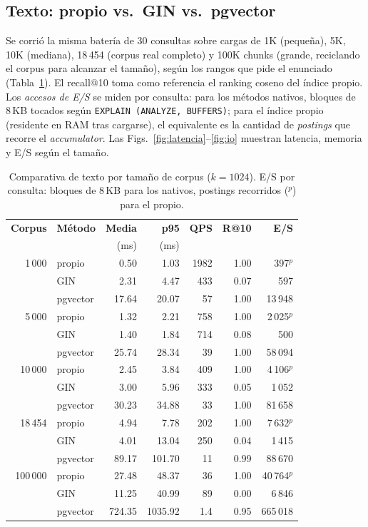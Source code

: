 \documentclass[conference]{IEEEtran}
\begin{document}
\subsection{Texto: propio vs.\ GIN vs.\ pgvector}
Se corrió la misma batería de 30 consultas sobre cargas de 1K (pequeña), 5K,
10K (mediana), 18\,454 (corpus real completo) y 100K chunks (grande, reciclando
el corpus para alcanzar el tamaño), según los rangos que pide el enunciado
(Tabla~\ref{tab:texto}). El recall@10 toma como referencia el ranking coseno
del índice propio. Los \emph{accesos de E/S} se miden por consulta: para los
métodos nativos, bloques de 8\,KB tocados según
\texttt{EXPLAIN (ANALYZE, BUFFERS)}; para el índice propio (residente en RAM
tras cargarse), el equivalente es la cantidad de \textit{postings} que recorre
el \textit{accumulator}. Las Figs.~\ref{fig:latencia}--\ref{fig:io} muestran
latencia, memoria y E/S según el tamaño.

\begin{table}[htbp]
\caption{Comparativa de texto por tamaño de corpus ($k{=}1024$). E/S por
consulta: bloques de 8\,KB para los nativos, postings recorridos ($^{p}$)
para el propio.}
\label{tab:texto}
\centering
\scriptsize
\begin{tabular}{@{}rlrrrrr@{}}
\toprule
\textbf{Corpus} & \textbf{Método} & \textbf{Media} & \textbf{p95} &
\textbf{QPS} & \textbf{R@10} & \textbf{E/S} \\
 & & (ms) & (ms) & & & \\
\midrule
1\,000   & propio   & 0.50   & 1.03    & 1982 & 1.00 & 397$^{p}$ \\
         & GIN      & 2.31   & 4.47    & 433  & 0.07 & 597 \\
         & pgvector & 17.64  & 20.07   & 57   & 1.00 & 13\,948 \\
\midrule
5\,000   & propio   & 1.32   & 2.21    & 758  & 1.00 & 2\,025$^{p}$ \\
         & GIN      & 1.40   & 1.84    & 714  & 0.08 & 500 \\
         & pgvector & 25.74  & 28.34   & 39   & 1.00 & 58\,094 \\
\midrule
10\,000  & propio   & 2.45   & 3.84    & 409  & 1.00 & 4\,106$^{p}$ \\
         & GIN      & 3.00   & 5.96    & 333  & 0.05 & 1\,052 \\
         & pgvector & 30.23  & 34.88   & 33   & 1.00 & 81\,658 \\
\midrule
18\,454  & propio   & 4.94   & 7.78    & 202  & 1.00 & 7\,632$^{p}$ \\
         & GIN      & 4.01   & 13.04   & 250  & 0.04 & 1\,415 \\
         & pgvector & 89.17  & 101.70  & 11   & 0.99 & 88\,670 \\
\midrule
100\,000 & propio   & 27.48  & 48.37   & 36   & 1.00 & 40\,764$^{p}$ \\
         & GIN      & 11.25  & 40.99   & 89   & 0.00 & 6\,846 \\
         & pgvector & 724.35 & 1035.92 & 1.4  & 0.95 & 665\,018 \\
\bottomrule
\end{tabular}
\end{table}
\end{document}
